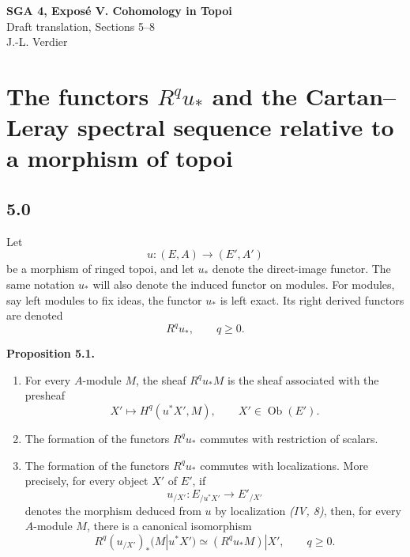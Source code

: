 \documentclass[11pt]{article}
\newcommand{\ob}{\operatorname{Ob}}
\newenvironment{statement}[1]{\par\medskip\noindent\textbf{#1.}\ }{\par\medskip}
\begin{document}
\begin{center}
{\Large \textbf{SGA 4, Expos\'e V. Cohomology in Topoi}}\\[0.35em]
{\large Draft translation, Sections 5--8}\\[0.35em]
J.-L. Verdier
\end{center}

\bigskip


\setcounter{section}{4}
\section[The functors Rq u* and the Cartan--Leray spectral sequence relative to a morphism of topoi]{The functors $R^q u_*$ and the Cartan--Leray spectral sequence relative to a morphism of topoi}

\subsection*{5.0}
Let
\[
        u:(E,A)\longrightarrow (E',A')
\]
be a morphism of ringed topoi, and let $u_*$ denote the direct-image functor. The same notation $u_*$ will also denote the induced functor on modules. For modules, say left modules to fix ideas, the functor $u_*$ is left exact. Its right derived functors are denoted
\[
        R^q u_* ,\qquad q\geq 0.
\]

\begin{statement}{Proposition 5.1}
\begin{enumerate}[label=\arabic*)]
\item For every $A$-module $M$, the sheaf $R^q u_*M$ is the sheaf associated with the presheaf
\[
        X'\longmapsto H^q(u^*X',M),\qquad X'\in\ob(E').
\]
\item The formation of the functors $R^q u_*$ commutes with restriction of scalars.
\item The formation of the functors $R^q u_*$ commutes with localizations. More precisely, for every object $X'$ of $E'$, if
\[
        u_{/X'}:E_{/u^*X'}\longrightarrow E'_{/X'}
\]
denotes the morphism deduced from $u$ by localization \emph{(IV, 8)}, then, for every $A$-module $M$, there is a canonical isomorphism
\begin{equation*}
        R^q(u_{/X'})_*(M|u^*X')\simeq (R^q u_*M)|X',\qquad q\geq 0 . \tag{5.1.1}
\end{equation*}
\end{enumerate}
\end{statement}
\end{document}
